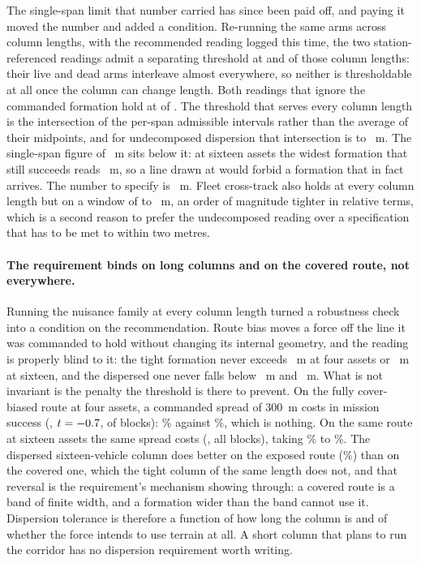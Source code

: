 \documentclass[11pt]{article}
\begin{document}
The single-span limit that number carried has since been paid off, and paying it moved the number
and added a condition. Re-running the same arms across \DkSpreadSpans{} column lengths, with the
recommended reading logged this time, the two station-referenced readings admit a separating
threshold at \DkScalarHeld{} and \DkCrossHeld{} of those column lengths: their live and dead arms
interleave almost everywhere, so neither is thresholdable at all once the column can change length.
Both readings that ignore the commanded formation hold at \DkSpreadHeld{} of \DkSpreadSpans{}. The
threshold that serves every column length is the intersection of the per-span admissible intervals
rather than the average of their midpoints, and for undecomposed dispersion that intersection is
\DkSpreadLo{} to \DkSpreadHi{}~m. The single-span figure of \DsSpreadThresh{}~m sits below it: at
sixteen assets the widest formation that still succeeds reads \DkWidestAlive{}~m, so a line drawn at
\DsSpreadThresh{} would forbid a formation that in fact arrives. The number to specify is
\DkSpreadThresh{}~m. Fleet cross-track also holds at every column length but on a window of
\DkFCrossLo{} to \DkFCrossHi{}~m, an order of magnitude tighter in relative terms, which is a second
reason to prefer the undecomposed reading over a specification that has to be met to within two
metres.

\paragraph{The requirement binds on long columns and on the covered route, not everywhere.} Running
the nuisance family at every column length turned a robustness check into a condition on the
recommendation. Route bias moves a force off the line it was commanded to hold without changing its
internal geometry, and the reading is properly blind to it: the tight formation never exceeds
\DkTightFourHi{}~m at four assets or \DkTightSixHi{}~m at sixteen, and the dispersed one never falls
below \DkWideFourLo{}~m and \DkWideSixLo{}~m. What is not invariant is the penalty the threshold is
there to prevent. On the fully cover-biased route at four assets, a commanded spread of 300~m costs
\DkCostFour{} in mission success (\DkCostFourV{}, $t = -0.7{}$, \DkCostFourBlocks{} of
\DkBlocks{} blocks): \DkTightFourCover\% against \DkWideFourCover\%, which is nothing. On the same
route at sixteen assets the same spread costs \DkCostSix{} (\DkCostSixV{}, all \DkBlocks{} blocks),
taking \DkTightSixCover\% to \DkWideSixCover\%. The dispersed sixteen-vehicle column does better on
the exposed route (\DkWideSixFlat\%) than on the covered one, which the tight column of the same
length does not, and that reversal is the requirement's mechanism showing through: a covered route is
a band of finite width, and a formation wider than the band cannot use it. Dispersion tolerance is
therefore a function of how long the column is and of whether the force intends to use terrain at
all. A short column that plans to run the corridor has no dispersion requirement worth writing.
\end{document}
